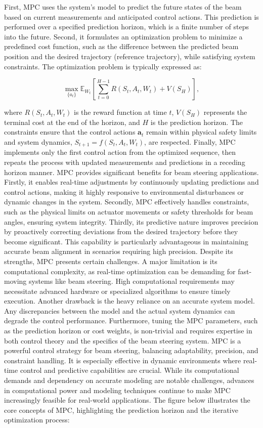 \documentclass[journal,article,submit,pdftex,moreauthors]{Definitions/mdpi}
\begin{document}
First, MPC uses the system's model to predict the future states of the beam based on current measurements and anticipated control actions. This prediction is performed over a specified prediction horizon, which is a finite number of steps into the future. Second, it formulates an optimization problem to minimize a predefined cost function, such as the difference between the predicted beam position and the desired trajectory (reference trajectory), while satisfying system constraints. The optimization problem is typically expressed as:

\[
\max_{\{a_t\}} \mathbb{E}_{W_t} \left[ \sum_{t=0}^{H-1} R(S_t, A_t, W_t) + V(S_H) \right],
\]

where $R(S_t, A_t, W_t)$ is the reward function at time $t$, $V(S_H)$ represents the terminal cost at the end of the horizon, and $H$ is the prediction horizon. The constraints ensure that the control actions $\mathbf{a}_t$ remain within physical safety limits and system dynamics, $S_{t+1} = f(S_t, A_t, W_t)$, are respected. Finally, MPC implements only the first control action from the optimized sequence, then repeats the process with updated measurements and predictions in a receding horizon manner. MPC provides significant benefits for beam steering applications. Firstly, it enables real-time adjustments by continuously updating predictions and control actions, making it highly responsive to environmental disturbances or dynamic changes in the system. Secondly, MPC effectively handles constraints, such as the physical limits on actuator movements or safety thresholds for beam angles, ensuring system integrity. Thirdly, its predictive nature improves precision by proactively correcting deviations from the desired trajectory before they become significant. This capability is particularly advantageous in maintaining accurate beam alignment in scenarios requiring high precision. 
Despite its strengths, MPC presents certain challenges. A major limitation is its computational complexity, as real-time optimization can be demanding for fast-moving systems like beam steering. High computational requirements may necessitate advanced hardware or specialized algorithms to ensure timely execution. Another drawback is the heavy reliance on an accurate system model. Any discrepancies between the model and the actual system dynamics can degrade the control performance. Furthermore, tuning the MPC parameters, such as the prediction horizon or cost weights, is non-trivial and requires expertise in both control theory and the specifics of the beam steering system.
MPC is a powerful control strategy for beam steering, balancing adaptability, precision, and constraint handling. It is especially effective in dynamic environments where real-time control and predictive capabilities are crucial. While its computational demands and dependency on accurate modeling are notable challenges, advances in computational power and modeling techniques continue to make MPC increasingly feasible for real-world applications. The figure below illustrates the core concepts of MPC, highlighting the prediction horizon and the iterative optimization process:
\end{document}
